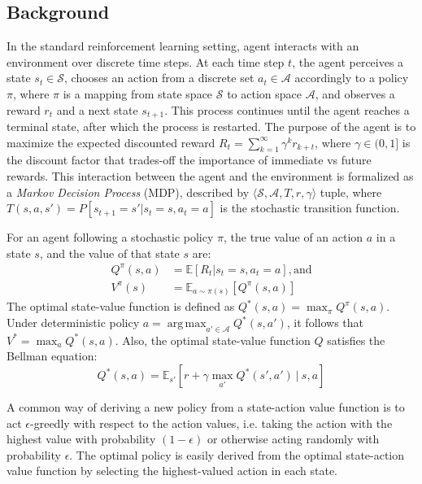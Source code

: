 \documentclass{article}
\DeclareMathOperator*{\argmax}{arg\,max}
\begin{document}
    \subsection{Background}
    \label{subsec:background}
    In the standard reinforcement learning setting, agent interacts with an environment over discrete time steps.
    At each time step $t$, the agent perceives a state $s_{t} \in \mathcal{S}$, chooses an action from a discrete set $a_{t} \in \mathcal{A}$ accordingly to a policy $\pi$, where $\pi$ is a mapping from state space $\mathcal{S}$ to action space $\mathcal{A}$, and observes a reward $r_{t}$ and a next state $s_{t+1}$.
    This process continues until the agent reaches a terminal state, after which the process is restarted.
    The purpose of the agent is to maximize the expected discounted reward $R_{t} = \sum_{k=1}^\infty \gamma^k r_{k+t}$, where $\gamma \in (0, 1]$ is the discount factor that trades-off the importance of immediate vs future rewards.
    This interaction between the agent and the environment is formalized as a \emph{Markov Decision Process} (MDP), described by $\langle \mathcal{S}, \mathcal{A}, T, r, \gamma \rangle$ tuple, where $T(s, a, s') = P[s_{t+1} = s' | s_{t} = s, a_{t} = a]$ is the stochastic transition function.

    For an agent following a stochastic policy $\pi$, the true value of an action $a$ in a state $s$, and the value of that state $s$ are:
    \begin{align}
        Q^{\pi}(s, a) &= \mathbb{E}[R_{t} | s_{t} = s, a_{t} = a], \text{and} \label{eq:1} \\
        V^{\pi}(s) &= \mathbb{E}_{a\sim \pi(s)}[Q^{\pi}(s, a)] \label{eq:2}
    \end{align}
    The optimal state-value function is defined as $Q^{*}(s, a) = \max_{\pi}Q^{\pi}(s, a)$.
    Under deterministic policy $a = \argmax_{a' \in \mathcal{A}}Q^{*}(s, a')$, it follows that $V^{*} = \max_{a}Q^{*}(s, a)$.
    Also, the optimal state-value function $Q$ satisfies the Bellman equation:
    \begin{equation}
        Q^{*}(s, a) = \mathbb{E}_{s'}\left[r + \gamma \max_{a'} Q^{*}(s', a') \:|\: s, a\right]
    \end{equation}

    A common way of deriving a new policy from a state-action value function is to act $\epsilon$-greedly with respect to the action values, i.e. taking the action with the highest value with probability $(1 - \epsilon)$ or otherwise acting randomly with probability $\epsilon$.
    The optimal policy is easily derived from the optimal state-action value function by selecting the highest-valued action in each state.
\end{document}
